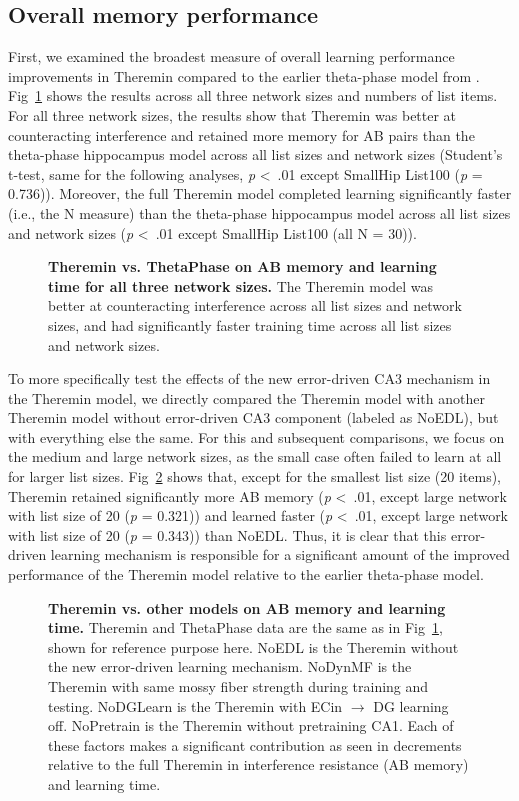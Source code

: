 \documentclass[10pt,letterpaper]{article}
\begin{document}
\subsection*{Overall memory performance}

First, we examined the broadest measure of overall learning performance improvements in Theremin compared to the earlier theta-phase model from \cite{KetzMorkondaOReilly13}.  Fig~\ref{fig3} shows the results across all three network sizes and numbers of list items.  For all three network sizes, the results show that Theremin was better at counteracting interference and retained more memory for AB pairs than the theta-phase hippocampus model across all list sizes and network sizes (Student's t-test, same for the following analyses, \emph{p} \textless \ .01 except SmallHip List100 (\emph{p} = 0.736)). Moreover, the full Theremin model completed learning significantly faster (i.e., the N measure) than the theta-phase hippocampus model across all list sizes and network sizes (\emph{p} \textless \ .01 except SmallHip List100 (all N = 30)).

\begin{figure}[!h]
  \caption{{\bf Theremin vs. ThetaPhase on AB memory and learning time for all three network sizes.}
  The Theremin model was better at counteracting interference across all list sizes and network sizes, and had significantly faster training time across all list sizes and network sizes.}
\label{fig3}
\end{figure}

To more specifically test the effects of the new error-driven CA3 mechanism in the Theremin model, we directly compared the Theremin model with another Theremin model without error-driven CA3 component (labeled as NoEDL), but with everything else the same. For this and subsequent comparisons, we focus on the medium and large network sizes, as the small case often failed to learn at all for larger list sizes.  Fig~\ref{fig4} shows that, except for the smallest list size (20 items), Theremin retained significantly more AB memory (\emph{p} \textless \ .01, except large network with list size of 20 (\emph{p} = 0.321)) and learned faster (\emph{p} \textless \ .01, except large network with list size of 20 (\emph{p} = 0.343)) than NoEDL.  Thus, it is clear that this error-driven learning mechanism is responsible for a significant amount of the improved performance of the Theremin model relative to the earlier theta-phase model.

\begin{figure}[!h]
  \caption{{\bf Theremin vs. other models on AB memory and learning time.}
  Theremin and ThetaPhase data are the same as in Fig~\ref{fig3}, shown for reference purpose here.  NoEDL is the Theremin without the new error-driven learning mechanism. NoDynMF is the Theremin with same mossy fiber strength during training and testing. NoDGLearn is the Theremin with ECin $\rightarrow$ DG learning off. NoPretrain is the Theremin without pretraining CA1. Each of these factors makes a significant contribution as seen in decrements relative to the full Theremin in interference resistance (AB memory) and learning time.}
\label{fig4}
\end{figure}
\end{document}
